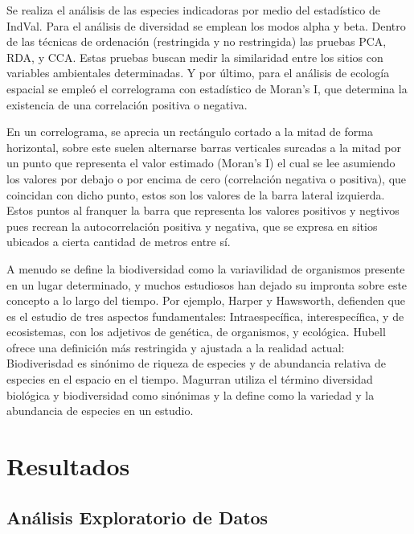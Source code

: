 \documentclass[11pt,]{article}
\begin{document}
Se realiza el análisis de las especies indicadoras por medio del
estadístico de IndVal. Para el análisis de diversidad se emplean los
modos alpha y beta. Dentro de las técnicas de ordenación (restringida y
no restringida) las pruebas PCA, RDA, y CCA. Estas pruebas buscan medir
la similaridad entre los sitios con variables ambientales determinadas.
Y por último, para el análisis de ecología espacial se empleó el
correlograma con estadístico de Moran's I, que determina la existencia
de una correlación positiva o negativa.

En un correlograma, se aprecia un rectángulo cortado a la mitad de forma
horizontal, sobre este suelen alternarse barras verticales surcadas a la
mitad por un punto que representa el valor estimado (Moran's I) el cual
se lee asumiendo los valores por debajo o por encima de cero
(correlación negativa o positiva), que coincidan con dicho punto, estos
son los valores de la barra lateral izquierda. Estos puntos al franquer
la barra que representa los valores positivos y negtivos pues recrean la
autocorrelación positiva y negativa, que se expresa en sitios ubicados a
cierta cantidad de metros entre sí.

A menudo se define la biodiversidad como la variavilidad de organismos
presente en un lugar determinado, y muchos estudiosos han dejado su
impronta sobre este concepto a lo largo del tiempo. Por ejemplo, Harper
y Hawsworth, defienden que es el estudio de tres aspectos fundamentales:
Intraespecífica, interespecífica, y de ecosistemas, con los adjetivos de
genética, de organismos, y ecológica. Hubell ofrece una definición más
restringida y ajustada a la realidad actual: Biodiverisdad es sinónimo
de riqueza de especies y de abundancia relativa de especies en el
espacio en el tiempo. Magurran utiliza el término diversidad biológica y
biodiversidad como sinónimas y la define como la variedad y la
abundancia de especies en un estudio.

\section{Resultados}\label{resultados}

\subsection{Análisis Exploratorio de
Datos}\label{anuxe1lisis-exploratorio-de-datos}
\end{document}
